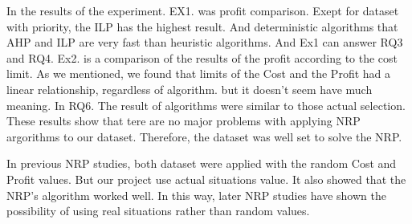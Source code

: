 In the results of the experiment.
EX1. was profit comparison. Exept for dataset with priority, the ILP has the highest result. And deterministic algorithms that AHP and ILP are very fast than heuristic algorithms. And Ex1 can answer RQ3 and RQ4. Ex2. is a comparison of the results of the profit according to the cost limit. As we mentioned, we found that limits of the Cost and the Profit had a linear relationship, regardless of algorithm. but it doesn't seem have much meaning. In RQ6. The result of algorithms were similar to those actual selection. These results show that tere are no major problems with applying NRP argorithms to our dataset. Therefore, the dataset was well set to solve  the NRP.

In previous NRP studies, both dataset were applied with the random Cost and Profit values. But our project use actual situations value. It also showed that the NRP's algorithm worked well. In this way, later NRP studies have shown the possibility of using real situations rather than random values. 


